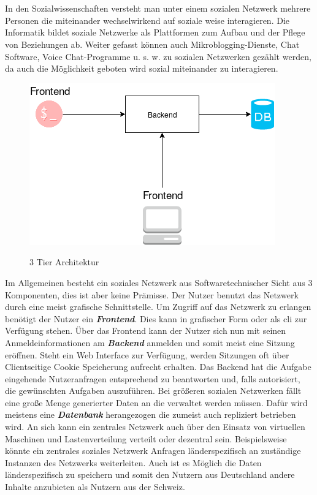 \section{
}
In den Sozialwissenschaften versteht man unter einem sozialen Netzwerk mehrere Personen die miteinander wechselwirkend auf soziale weise interagieren. Die Informatik bildet soziale Netzwerke als Plattformen zum Aufbau und der Pflege von Beziehungen ab. Weiter gefasst können auch Mikroblogging-Dienste, Chat Software, Voice Chat-Programme u. s. w. zu sozialen Netzwerken gezählt werden, da auch die Möglichkeit geboten wird sozial miteinander zu interagieren\cite{wikipedia-social-network-sociology}.
	\begin{figure}[h]
		\begin{minipage}{\textwidth}
			\centering
			\includegraphics[scale=0.55]{figures/central-social-network.png}
			\label{fig:central-social-network}
			\caption{3 Tier Architektur}
		\end{minipage}
	\end{figure}
	Im Allgemeinen besteht ein soziales Netzwerk aus Softwaretechnischer Sicht aus 3 Komponenten, dies ist aber keine Prämisse. Der Nutzer benutzt das Netzwerk durch eine meist grafische Schnittstelle. Um Zugriff auf das Netzwerk zu erlangen benötigt der Nutzer ein \textit{\textbf{Frontend}}. Dies kann in grafischer Form oder als \gls{cli} zur Verfügung stehen. Über das Frontend kann der Nutzer sich nun mit seinen Anmeldeinformationen am \textit{\textbf{Backend}} anmelden und somit meist eine Sitzung eröffnen. Steht ein Web Interface zur Verfügung, werden Sitzungen oft über Clientseitige Cookie Speicherung aufrecht erhalten. Das Backend hat die Aufgabe eingehende Nutzeranfragen entsprechend zu beantworten und, falls autorisiert, die gewünschten Aufgaben auszuführen. Bei größeren sozialen Netzwerken fällt eine große Menge generierter Daten an die verwaltet werden müssen. Dafür wird meistens eine \textit{\textbf{Datenbank}} herangezogen die zumeist auch repliziert betrieben wird. An sich kann ein zentrales Netzwerk auch über den Einsatz von virtuellen Maschinen und Lastenverteilung verteilt oder dezentral sein. Beispielsweise könnte ein zentrales soziales Netzwerk Anfragen länderspezifisch an zuständige Instanzen des Netzwerks weiterleiten. Auch ist es Möglich die Daten länderspezifisch zu speichern und somit den Nutzern aus Deutschland andere Inhalte anzubieten als Nutzern aus der Schweiz.\par
